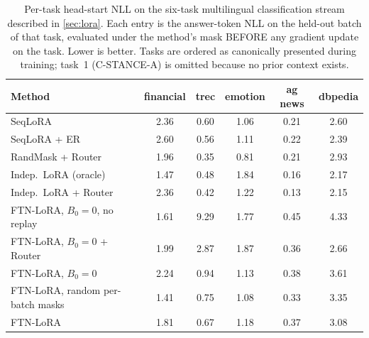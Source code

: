 \begin{table}[t]
\centering
\small
\caption{Per-task head-start NLL on the six-task multilingual classification stream described in \cref{sec:lora}. Each entry is the answer-token NLL on the held-out batch of that task, evaluated under the method's mask BEFORE any gradient update on the task. Lower is better. Tasks are ordered as canonically presented during training; task~1 (C-STANCE-A) is omitted because no prior context exists.}
\label{tab:lora_hs_per_task}
\begin{tabular}{lccccc}
\toprule
Method & financial & trec & emotion & ag news & dbpedia \\
\midrule
SeqLoRA & 2.36 & 0.60 & 1.06 & 0.21 & 2.60 \\
SeqLoRA + ER & 2.60 & 0.56 & 1.11 & 0.22 & 2.39 \\
RandMask + Router & 1.96 & 0.35 & 0.81 & 0.21 & 2.93 \\
Indep.\ LoRA (oracle) & 1.47 & 0.48 & 1.84 & 0.16 & 2.17 \\
Indep.\ LoRA + Router & 2.36 & 0.42 & 1.22 & 0.13 & 2.15 \\
FTN-LoRA, $B_0=0$, no replay & 1.61 & 9.29 & 1.77 & 0.45 & 4.33 \\
FTN-LoRA, $B_0=0$ + Router & 1.99 & 2.87 & 1.87 & 0.36 & 2.66 \\
FTN-LoRA, $B_0=0$ & 2.24 & 0.94 & 1.13 & 0.38 & 3.61 \\
FTN-LoRA, random per-batch masks & 1.41 & 0.75 & 1.08 & 0.33 & 3.35 \\
FTN-LoRA & 1.81 & 0.67 & 1.18 & 0.37 & 3.08 \\
\bottomrule
\end{tabular}
\end{table}
